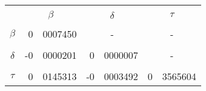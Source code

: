 		

		\begin{tabular}{cr@{.}lr@{.}lr@{.}l}
		& \multicolumn{2}{c}{ } & \multicolumn{2}{c}{ } & \multicolumn{2}{c}{ } \\
		& \multicolumn{2}{c}{{\bf{$\beta$}}} & \multicolumn{2}{c}{{\bf{$\delta$}}} & \multicolumn{2}{c}{{\bf{$\tau$}}} \\
		& \multicolumn{2}{c}{ } & \multicolumn{2}{c}{ } & \multicolumn{2}{c}{ } \\
		{\bf{$\beta$}} &			 0&0007450		&	\multicolumn{2}{c}{ - }		&  \multicolumn{2}{c}{ - }	\\
		& \multicolumn{2}{c}{ } & \multicolumn{2}{c}{ } & \multicolumn{2}{c}{ } \\
		 {\bf{$\delta$}} &			-0&0000201		&	0&0000007				& \multicolumn{2}{c}{ - } \\
		& \multicolumn{2}{c}{ } & \multicolumn{2}{c}{ } & \multicolumn{2}{c}{ } \\
		 {\bf{$\tau$}} &			0&0145313		&	-0&0003492				& 0&3565604 \\
		\end{tabular}

